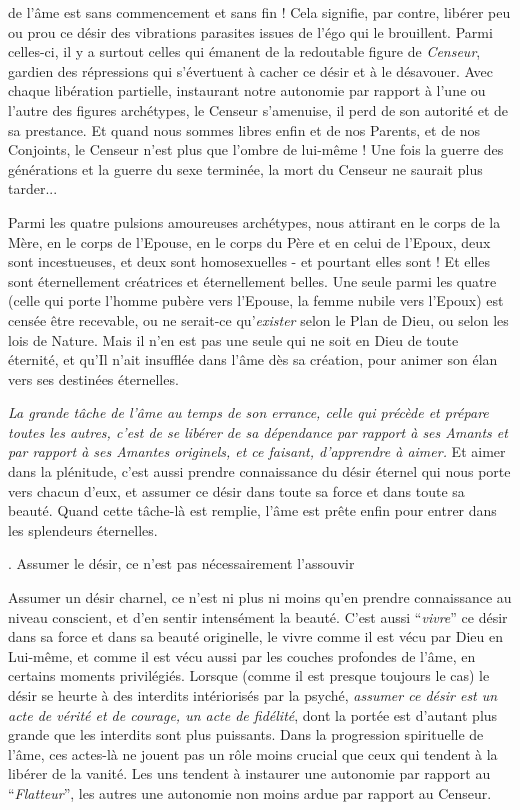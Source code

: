 
de l’âme est sans commencement et sans fin ! Cela signifie, par contre, libérer peu ou prou ce désir des vibrations parasites issues de l’égo qui le brouillent. Parmi celles-ci, il y a surtout celles qui émanent de la redoutable figure de \textit{Censeur}, gardien des répressions qui s’évertuent à cacher ce désir et à le désavouer. Avec chaque libération partielle, instaurant notre autonomie par rapport à l’une ou l’autre des figures archétypes, le Censeur s’amenuise, il perd de son autorité et de sa prestance. Et quand nous sommes libres enfin et de nos Parents, et de nos Conjoints, le Censeur n’est plus que l’ombre de lui-même ! Une fois la guerre des générations et la guerre du sexe terminée, la mort du Censeur ne saurait plus tarder...

Parmi les quatre pulsions amoureuses archétypes, nous attirant en le corps de la Mère, en le corps de l’Epouse, en le corps du Père et en celui de l’Epoux, deux sont incestueuses, et deux sont homosexuelles - et pourtant elles sont ! Et elles sont éternellement créatrices et éternellement belles. Une seule parmi les quatre (celle qui porte l’homme pubère vers l’Epouse, la femme nubile vers l’Epoux) est censée être recevable, ou ne serait-ce qu’\textit{exister} selon le Plan de Dieu, ou selon les lois de Nature. Mais il n’en est pas une seule qui ne soit en Dieu de toute éternité, et qu’Il n’ait insufflée dans l’âme dès sa création, pour animer son élan vers ses destinées éternelles.

\textit{La grande tâche de l’âme au temps de son errance, celle qui précède et prépare toutes les autres, c’est de se libérer de sa dépendance par rapport à ses Amants et par rapport à ses Amantes originels, et ce faisant, d’apprendre à aimer.} Et aimer dans la plénitude, c’est aussi prendre connaissance du désir éternel qui nous porte vers chacun d’eux, et assumer ce désir dans toute sa force et dans toute sa beauté. Quand cette tâche-là est remplie, l’âme est prête enfin pour entrer dans les splendeurs éternelles.

. Assumer le désir, ce n’est pas nécessairement l’assouvir

Assumer un désir charnel, ce n’est ni plus ni moins qu’en prendre connaissance au niveau conscient, et d’en sentir intensément la beauté. C’est aussi ``\textit{vivre}'' ce désir dans sa force et dans sa beauté originelle, le vivre comme il est vécu par Dieu en Lui-même, et comme il est vécu aussi par les couches profondes de l’âme, en certains moments privilégiés. Lorsque (comme il est presque toujours le cas) le désir se heurte à des interdits intériorisés par la psyché, \textit{assumer ce désir est un acte de vérité et de courage, un acte de fidélité}, dont la portée est d’autant plus grande que les interdits sont plus puissants. Dans la progression spirituelle de l’âme, ces actes-là ne jouent pas un rôle moins crucial que ceux qui tendent à la libérer de la vanité. Les uns tendent à instaurer une autonomie par rapport au ``\textit{Flatteur}'', les autres une autonomie non moins ardue par rapport au Censeur.

